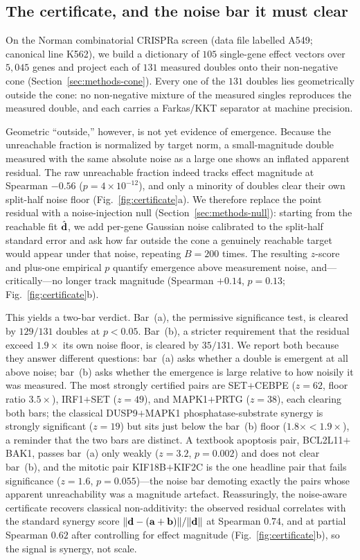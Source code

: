 \subsection{The certificate, and the noise bar it must clear}
\label{sec:results-certificate}

On the Norman combinatorial CRISPRa screen (data file labelled A549; canonical line K562), we
build a dictionary of $105$ single-gene effect vectors over $5{,}045$ genes and project each of
$131$ measured doubles onto their non-negative cone (Section~\ref{sec:methods-cone}). Every one of
the $131$ doubles lies geometrically outside the cone: no non-negative mixture of the measured
singles reproduces the measured double, and each carries a Farkas/KKT separator at machine
precision.

Geometric ``outside,'' however, is not yet evidence of emergence. Because the unreachable fraction
is normalized by target norm, a small-magnitude double measured with the same absolute noise as a
large one shows an inflated apparent residual. The raw unreachable fraction indeed tracks effect
magnitude at Spearman $-0.56$ ($p=4\times10^{-12}$), and only a minority of doubles clear their own
split-half noise floor (Fig.~\ref{fig:certificate}a). We therefore replace the point residual with
a noise-injection null (Section~\ref{sec:methods-null}): starting from the reachable fit
$\hat{\mathbf{d}}$, we add per-gene Gaussian noise calibrated to the split-half standard error and ask
how far outside the cone a genuinely reachable target would appear under that noise, repeating
$B=200$ times. The resulting $z$-score and plus-one empirical $p$ quantify emergence above
measurement noise, and---critically---no longer track magnitude (Spearman $+0.14$, $p=0.13$;
Fig.~\ref{fig:certificate}b).

This yields a two-bar verdict. Bar~(a), the permissive significance test, is cleared by $129/131$
doubles at $p<0.05$. Bar~(b), a stricter requirement that the residual exceed $1.9\times$ its own
noise floor, is cleared by $35/131$. We report both because they answer different questions: bar~(a)
asks whether a double is emergent at all above noise; bar~(b) asks whether the emergence is large
relative to how noisily it was measured. The most strongly certified pairs are
SET$+$CEBPE ($z=62$, floor ratio $3.5\times$), IRF1$+$SET ($z=49$), and MAPK1$+$PRTG ($z=38$), each
clearing both bars; the classical DUSP9$+$MAPK1 phosphatase-substrate synergy is strongly
significant ($z=19$) but sits just below the bar~(b) floor ($1.8\times<1.9\times$), a reminder that
the two bars are distinct. A textbook
apoptosis pair, BCL2L11$+$BAK1, passes bar~(a) only weakly ($z=3.2$, $p=0.002$) and does not clear
bar~(b), and the mitotic pair KIF18B$+$KIF2C is the one headline pair that fails significance
($z=1.6$, $p=0.055$)---the noise bar demoting exactly the pairs whose apparent unreachability was a
magnitude artefact. Reassuringly, the noise-aware certificate recovers classical non-additivity:
the observed residual correlates with the standard synergy score $\lVert\mathbf{d}-(\mathbf{a}+\mathbf{b})\rVert/\lVert\mathbf{d}\rVert$
at Spearman $0.74$, and at partial Spearman $0.62$ after controlling for effect magnitude
(Fig.~\ref{fig:certificate}b), so the signal is synergy, not scale.

